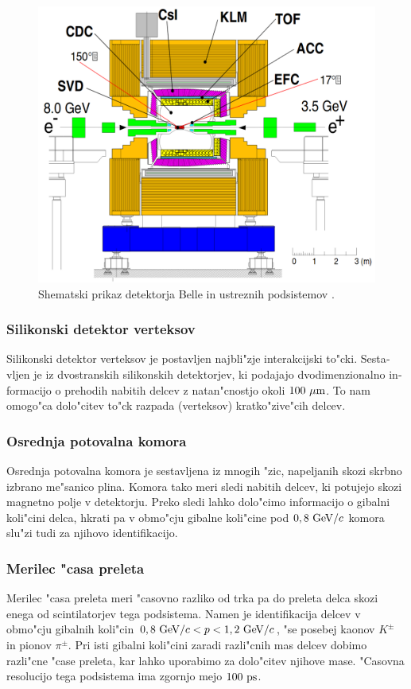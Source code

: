 \begin{otherlanguage}{slovene}
\begin{figure}[H]
	\centering
	\captionsetup{width=0.8\linewidth}
	\includegraphics[width=0.8\linewidth]{fig/setup/Belle_detector}
	\caption{Shematski prikaz detektorja Belle in ustreznih podsistemov \cite{ABASHIAN2002117}.}
	\label{fig:bdet_si}
\end{figure}

\subsubsection{Silikonski  detektor verteksov}
Silikonski detektor verteksov je postavljen najbli"zje interakcijski to"cki. Sestavljen je iz dvostranskih silikonskih detektorjev, ki podajajo dvodimenzionalno informacijo o prehodih nabitih delcev z natan"cnostjo okoli $100\mathrm{~\mu m}$. To nam omogo"ca dolo"citev to"ck razpada (verteksov) kratko"zive"cih delcev.

\subsubsection{Osrednja potovalna komora}
Osrednja potovalna komora je sestavljena iz mnogih "zic, napeljanih skozi skrbno izbrano me"sanico plina. Komora tako meri sledi nabitih delcev, ki potujejo skozi magnetno polje v detektorju. Preko sledi lahko dolo"cimo informacijo o gibalni koli"cini delca, hkrati pa v obmo"cju gibalne koli"cine pod $0,8\mathrm{~GeV}/c$ komora slu"zi tudi za njihovo identifikacijo.

\subsubsection{Merilec "casa preleta}
Merilec "casa preleta meri "casovno razliko od trka pa do preleta delca skozi enega od scintilatorjev tega podsistema. Namen je identifikacija delcev v obmo"cju gibalnih koli"cin $0,8\mathrm{~GeV}/c < p < 1,2\mathrm{~GeV}/c$, "se posebej kaonov $K^\pm$ in pionov $\pi^\pm$. Pri isti gibalni koli"cini zaradi razli"cnih mas delcev dobimo razli"cne "case preleta, kar lahko uporabimo za dolo"citev njihove mase. "Casovna resolucijo tega podsistema ima zgornjo mejo $100\mathrm{~ps}$.


\end{otherlanguage}
